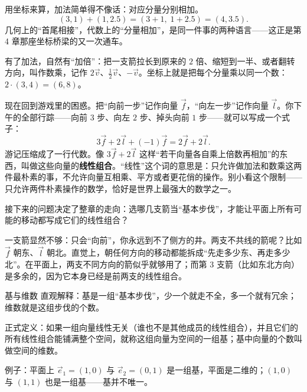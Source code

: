 \begin{center}
\end{center}

用坐标来算，加法简单得不像话：对应分量分别相加。
\[
(3,1)+(1,2.5)=(3+1,\;1+2.5)=(4,3.5).
\]
几何上的“首尾相接”，代数上的“分量相加”，是同一件事的两种语言——这正是第 4 章那座坐标桥梁的又一次通车。

有了加法，自然有“加倍”：把一支箭拉长到原来的 $2$ 倍、缩短到一半、或者翻转方向，叫作数乘，记作 $2\vec{v}$、$\tfrac{1}{2}\vec{v}$、$-\vec{v}$。坐标上就是把每个分量乘以同一个数：$2\cdot(3,4)=(6,8)$。

现在回到游戏里的困惑。把“向前一步”记作向量 $\vec{f}$，“向左一步”记作向量 $\vec{l}$。你下午的全部行踪——向前 $3$ 步、向左 $2$ 步、掉头向前 $1$ 步——就可以写成一个式子：
\[
3\vec{f}+2\vec{l}+(-1)\vec{f}=2\vec{f}+2\vec{l}.
\]
游记压缩成了一行代数。像 $3\vec{f}+2\vec{l}$ 这样“若干向量各自乘上倍数再相加”的东西，叫做这些向量的\textbf{线性组合}。“线性”这个词的意思是：只允许做加法和数乘这两件最朴素的事，不允许向量互相乘、平方或者更花俏的操作。别小看这个限制——只允许两件朴素操作的数学，恰好是世界上最强大的数学之一。

接下来的问题决定了整章的走向：选哪几支箭当“基本步伐”，才能让平面上所有可能的移动都写成它们的线性组合？

一支箭显然不够：只会“向前”，你永远到不了侧方的井。两支不共线的箭呢？比如 $\vec{f}$ 朝东、$\vec{l}$ 朝北。直觉上，朝任何方向的移动都能拆成“先走多少东、再走多少北”。在平面上，两支不同方向的箭似乎就够用了；而第 $3$ 支箭（比如东北方向）是多余的，因为它本身已经是前两支的线性组合。

\begin{shuyu}{基与维数}
直观解释：基是一组“基本步伐”，少一个就走不全，多一个就有冗余；维数就是这组步伐的个数。

正式定义：如果一组向量线性无关（谁也不是其他成员的线性组合），并且它们的所有线性组合能铺满整个空间，就称这组向量为空间的一组基；基中向量的个数叫做空间的维数。

例子：平面上 $\vec{e}_1=(1,0)$ 与 $\vec{e}_2=(0,1)$ 是一组基，平面是二维的；$(1,0)$ 与 $(1,1)$ 也是一组基——基并不唯一。
\end{shuyu}

